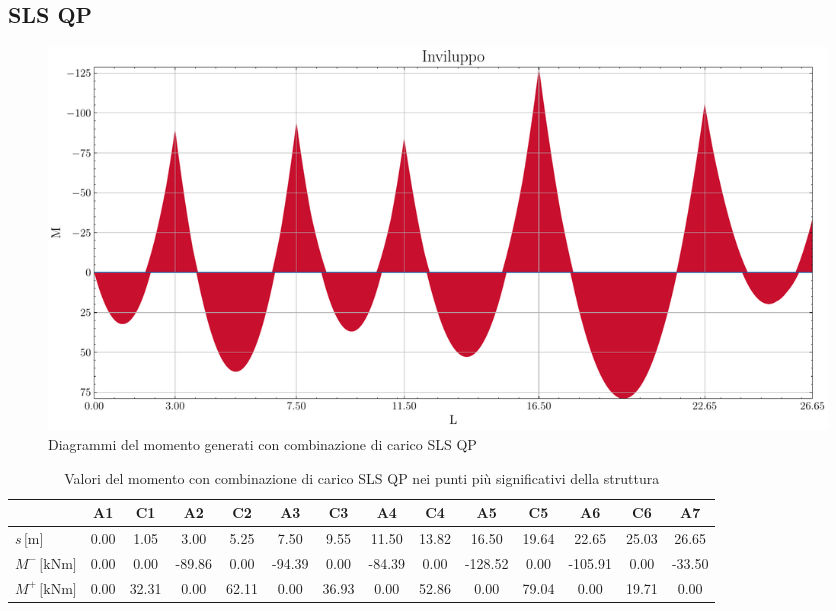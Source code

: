 \begin{landscape}
\subsection{SLS QP}
\begin{figure}[H]
\centering
\includegraphics[height=0.6\textwidth]{IMG/diagrammi_trave/SLS_QP_M.pdf}
\caption{Diagrammi del momento generati con combinazione di carico SLS QP}
\label{fig:trave_SLS_QP_momento}
\end{figure}
\begin{table}[H]
\footnotesize
\centering
\caption{Valori del momento con combinazione di carico SLS QP nei punti più significativi della struttura}
\label{tab:trave_SLS_QP_momento}
	\begin{tabular}{lS[table-format=-3.2]S[table-format=-3.2]S[table-format=-3.2]S[table-format=-3.2]S[table-format=-3.2]S[table-format=-3.2]S[table-format=-3.2]S[table-format=-3.2]S[table-format=-3.2]S[table-format=-3.2]S[table-format=-3.2]S[table-format=-3.2]S[table-format=-3.2]}
		\toprule
		{} & {A1} & {C1} & {A2} & {C2} & {A3} & {C3} & {A4} & {C4} & {A5} & {C5} & {A6} & {C6} & {A7} \\
		\midrule
		$s\,\si{[\metre]}$ & 0.00 & 1.05 & 3.00 & 5.25 & 7.50 & 9.55 & 11.50 & 13.82 & 16.50 & 19.64 & 22.65 & 25.03 & 26.65 \\
        $M^{-}\,\si{[\kilo\newton\metre]}$ & 0.00 & 0.00 & -89.86 & 0.00 & -94.39 & 0.00 & -84.39 & 0.00 & -128.52 & 0.00 & -105.91 & 0.00 & -33.50 \\
        $M^{+}\,\si{[\kilo\newton\metre]}$ & 0.00 & 32.31 & 0.00 & 62.11 & 0.00 & 36.93 & 0.00 & 52.86 & 0.00 & 79.04 & 0.00 & 19.71 & 0.00 \\
		\bottomrule
	\end{tabular}
\end{table}

\end{landscape}

